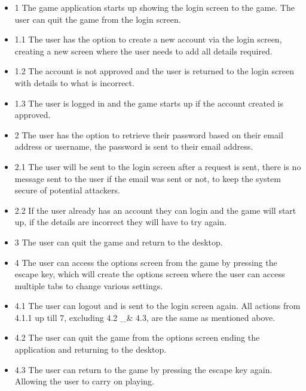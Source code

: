 \documentclass[letterpaper]{article}
\begin{document}
					\begin{itemize}
					\item 1 The game application starts up showing the login screen to the game. The user can quit the game from the login screen.
					\item 1.1 The user has the option to create a new account via the login screen, creating a new screen where the user needs to add all details required.
					\item 1.2 The account is not approved and the user is returned to the login screen with details to what is incorrect.
					\item 1.3 The user is logged in and the game starts up if the account created is approved.
					\item 2 The user has the option to retrieve their password based on their email address or username, the password is sent to their email address. 
					\item 2.1 The user will be sent to the login screen after a request is sent, there is no message sent to the user if the email was sent or not, to keep the system secure of potential attackers. 
					\item 2.2 If the user already has an account they can login and the game will start up, if the details are incorrect they will have to try again.
					\item 3 The user can quit the game and return to the desktop.
					
					\item 4 The user can access the options screen from the game by pressing the escape key, which will create the options screen where the user can access multiple tabs to change various settings.
					\item 4.1 The user can logout and is sent to the login screen again. All actions from 4.1.1 up till 7, excluding 4.2 \_& 4.3, are the same as mentioned above. 
					\item 4.2 The user can quit the game from the options screen ending the application and returning to the desktop.
					\item 4.3 The user can return to the game by pressing the escape key again. Allowing the user to carry on playing.
					\end{itemize}
					
\end{document}
